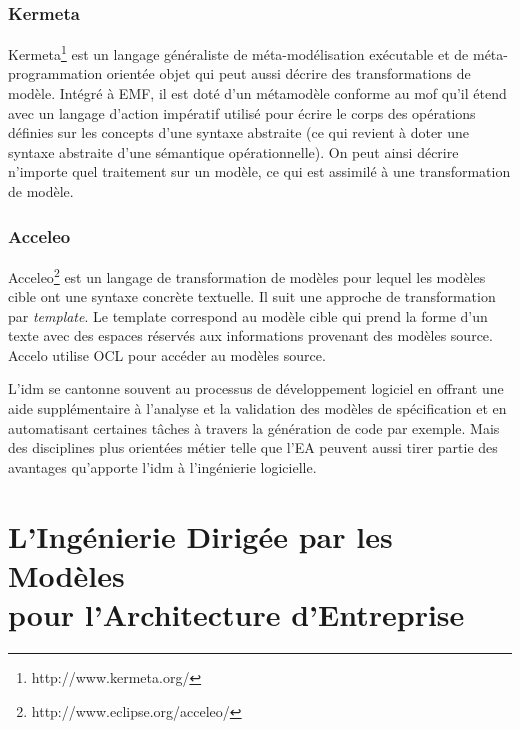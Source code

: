 \subsubsection{Kermeta}
Kermeta\footnote{http://www.kermeta.org/} est un langage généraliste de méta-modélisation exécutable et de 
méta-program\-mation orientée objet qui peut aussi décrire des transformations de 
modèle. Intégré à EMF, il est doté d'un métamodèle conforme au \gls{mof} qu'il étend 
avec un langage d'action impératif utilisé pour écrire le corps des opérations 
définies sur les concepts d'une syntaxe abstraite (ce qui revient à doter une 
syntaxe abstraite d'une sémantique opérationnelle). On peut ainsi décrire 
n'importe quel traitement sur un modèle, ce qui est assimilé à une transformation 
de modèle.


\subsubsection{Acceleo}
Acceleo\footnote{http://www.eclipse.org/acceleo/} est un langage de transformation de modèles pour lequel les modèles cible ont une syntaxe concrète textuelle. Il suit une approche de transformation par \textit{template}. Le template correspond au modèle cible qui prend la forme d'un texte avec des espaces réservés aux informations provenant des modèles source. Accelo utilise OCL pour accéder au modèles source.


L'\gls{idm} se cantonne souvent au processus de développement logiciel en offrant une aide supplémentaire à l'analyse et la validation des modèles de spécification et en automatisant certaines tâches à travers la génération de code par exemple. Mais des disciplines plus orientées métier telle que l'EA peuvent aussi tirer partie des avantages qu'apporte l'\gls{idm} à l'ingénierie logicielle.


\section[L'Ingénierie Dirigée par les Modèles pour l'Architecture d'Entreprise]%
        {L'Ingénierie Dirigée par les Modèles \\pour l'Architecture d'Entreprise}
\label{sec:idm_for_ea}

